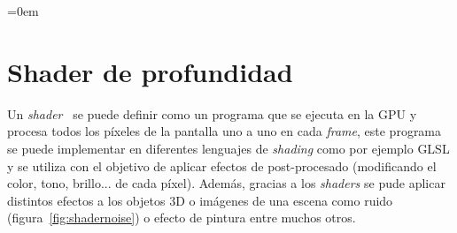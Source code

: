 \parindent=0em
\section{Shader de profundidad}
\label{sec:shaderProfundidad}
\noindent

Un \textit{shader}~\cite{thebookofshaders} se puede definir como un programa que se ejecuta en la GPU y procesa todos los píxeles de la pantalla uno a uno en cada \textit{frame}, este programa se puede implementar en diferentes lenguajes de \textit{shading} como por ejemplo GLSL y se utiliza con el objetivo de aplicar efectos de post-procesado (modificando el color, tono, brillo... de cada píxel). Además, gracias a los \textit{shaders} se pude aplicar distintos efectos a los objetos 3D o imágenes de una escena como ruido (figura~\ref{fig:shadernoise}) o efecto de pintura entre muchos otros.

